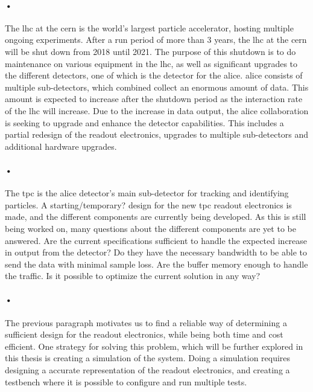\documentclass[a4paper]{report}
\begin{document}
\paragraph{•}
The \gls{lhc} at the \gls{cern} is the world's largest particle accelerator, hosting multiple ongoing experiments.
After a run period of more than 3 years, the \gls{lhc} at the \gls{cern} will be shut down from 2018 until 2021.\cite{ls2}
The purpose of this shutdown is to do maintenance on various equipment in the \gls{lhc}, as well as significant upgrades to the different detectors, one of which is the detector for the \gls{alice}.
\gls{alice} consists of multiple sub-detectors, which combined collect an enormous amount of data.
This amount is expected to increase after the shutdown period as the interaction rate of the \gls{lhc} will increase.
Due to the increase in data output, the \gls{alice} collaboration is seeking to upgrade and enhance the detector capabilities.\cite{alice-upgrade}
This includes a partial redesign of the readout electronics, upgrades to multiple sub-detectors and additional hardware upgrades.

\paragraph{•}
The \gls{tpc} is the \gls{alice} detector's main sub-detector for tracking and identifying particles.
A starting/temporary? design for the new \gls{tpc} readout electronics is made, and the different components are currently being developed.
As this is still being worked on, many questions about the different components are yet to be answered.
Are the current specifications sufficient to handle the expected increase in output from the detector?
Do they have the necessary bandwidth to be able to send the data with minimal sample loss.
Are the buffer memory enough to handle the traffic.
Is it possible to optimize the current solution in any way?

\paragraph{•}
The previous paragraph motivates us to find a reliable way of determining a sufficient design for the readout electronics, while being both time and cost efficient.
One strategy for solving this problem, which will be further explored in this thesis is creating a simulation of the system.
Doing a simulation requires designing a accurate representation of the readout electronics, and creating a testbench where it is possible to configure and run multiple tests.
\end{document}
